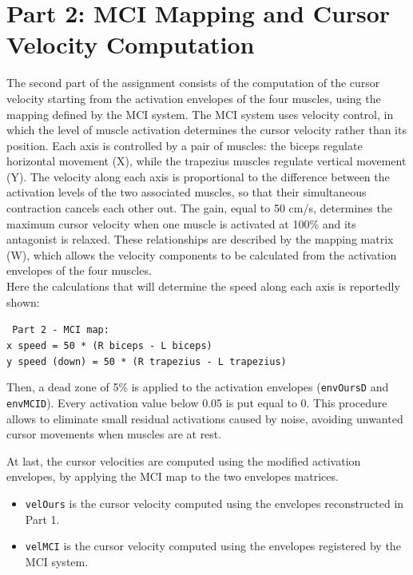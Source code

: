 \newpage
\section{Part 2: MCI Mapping and Cursor Velocity Computation}
The second part of the assignment consists of the computation of the cursor velocity starting from the activation envelopes of the four muscles, using the mapping defined by the MCI system.
The MCI system uses velocity control, in which the level of muscle activation determines the cursor velocity rather than its position. Each axis is controlled by a pair of muscles: the biceps regulate horizontal movement (X), while the trapezius muscles regulate vertical movement (Y). The velocity along each axis is proportional to the difference between the activation levels of the two associated muscles, so that their simultaneous contraction cancels each other out. The gain, equal to 50 cm/s, determines the maximum cursor velocity when one muscle is activated at 100\% and its antagonist is relaxed. These relationships are described by the mapping matrix (W), which allows the velocity components to be calculated from the activation envelopes of the four muscles.\\
Here the calculations that will determine the speed along each axis is reportedly shown:
\vspace{10pt}

\texttt{
Part 2 - MCI map:\\
  x speed        = 50 * (R biceps - L biceps)\\
  y speed (down) = 50 * (R trapezius - L trapezius)
}

\vspace{10pt}

Then, a dead zone of 5\% is applied to the activation envelopes (\texttt{envOursD} and \texttt{envMCID}). Every activation value below 0.05 is put equal to 0. This procedure allows to eliminate small residual activations caused by noise, avoiding unwanted cursor movements when muscles are at rest.

At last, the cursor velocities are computed using the modified activation envelopes, by applying the MCI map to the two envelopes matrices.
\begin{itemize}
    \item \texttt{velOurs} is the cursor velocity computed using the envelopes reconstructed in Part 1.
    \item \texttt{velMCI} is the cursor velocity computed using the envelopes registered by the MCI system.
\end{itemize}






